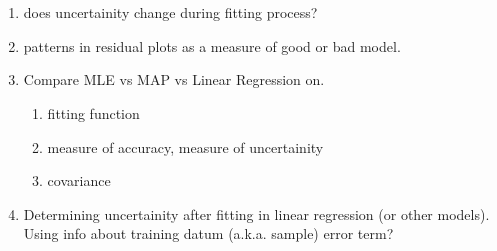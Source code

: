 \documentclass[../main.tex]{subfiles}
\begin{document}
\section{}
\begin{enumerate}[nolistsep]
  \item does uncertainity change during fitting process?
  \item patterns in residual plots as a measure of good or bad model.
  \item Compare MLE vs MAP vs Linear Regression on.
    \begin{enumerate}[nolistsep]
        \item fitting function
        \item measure of accuracy, measure of uncertainity
        \item covariance
    \end{enumerate}
  \item Determining uncertainity after fitting in linear regression (or other models). Using info about training datum (a.k.a. sample) error term?
\end{enumerate}
\end{document}
